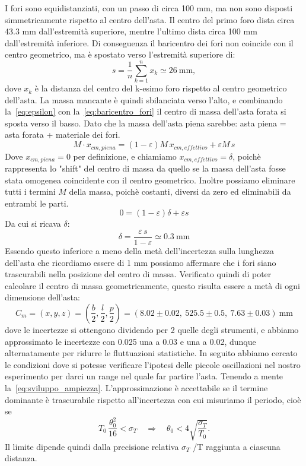 \documentclass[a4paper]{article}
\begin{document}
I fori sono equidistanziati, con un passo di circa 100 mm, ma non sono disposti simmetricamente rispetto al centro dell’asta. Il centro del primo foro dista circa 43.3 mm dall’estremità superiore, mentre l’ultimo dista circa 100 mm dall’estremità inferiore. Di conseguenza il baricentro dei fori non coincide con il centro geometrico, ma è spostato verso l’estremità superiore di:
\begin{equation}
    s = \frac{1}{n}\sum_{k=1}^{n} x_k \simeq 26\ \text{mm},
    \label{eq:baricentro_fori}
\end{equation}
dove $x_k$ è la distanza del centro del k-esimo foro rispetto al centro geometrico dell’asta. La massa mancante è quindi sbilanciata verso l’alto, e combinando la~\eqref{eq:epsilon} con la~\eqref{eq:baricentro_fori} il centro di massa dell’asta forata si sposta verso il basso. 
\newline
Dato che la massa dell'asta piena sarebbe: asta piena = asta forata + materiale dei fori.
$$M \cdot x_{cm, piena} = (1-\varepsilon)M\, x_{cm, effettivo} + \varepsilon M\, s$$
Dove $x_{cm,piena}=0$ per definizione, e chiamiamo $x_{cm,effettivo}=\delta$, poichè rappresenta lo "shift" del centro di massa da quello se la massa dell'asta fosse stata omogenea coincidente con il centro geometrico. Inoltre possiamo eliminare tutti i termini $M$ della massa, poichè costanti, diversi da zero ed eliminabili da entrambi le parti.
$$0 = (1-\varepsilon)\delta + \varepsilon s$$
Da cui si ricava $\delta$:
\begin{equation}
    \delta = \frac{\varepsilon\, s}{1-\varepsilon} \simeq 0.3\ \text{mm}
    \label{eq:spostamento_cm}
\end{equation}
 Essendo questo inferiore a meno della metà dell'incertezza sulla lunghezza dell'asta che ricordiamo essere di 1 mm possiamo affermare che i fori siano trascurabili nella posizione del centro di massa.
Verificato quindi di poter calcolare il centro di massa geometricamente, questo risulta essere a metà di ogni dimensione dell'asta:
\begin{equation}
    C_m = (x, y, z) = \left(\frac{b}{2}, \frac{l}{2}, \frac{p}{2}\right) = (8.02 \pm 0.02,\ 525.5 \pm 0.5,\ 7.63 \pm 0.03)\ \text{mm}
    \label{eq:centro_massa}
\end{equation}
dove le incertezze si ottengono dividendo per 2 quelle degli strumenti, e abbiamo approssimato le incertezze con 0.025 una a 0.03 e una a 0.02, dunque alternatamente per ridurre le fluttuazioni statistiche.
In seguito abbiamo cercato le condizioni dove si potesse verificare l'ipotesi delle piccole oscillazioni nel nostro esperimento per darci un range nel quale far partire l'asta.
Tenendo a mente la~\eqref{eq:sviluppo_ampiezza}.
L’approssimazione è accettabile se il termine dominante è trascurabile rispetto all’incertezza con cui misuriamo il periodo, cioè se
\begin{equation}
    T_0\,\frac{\theta_0^2}{16} < \sigma_T \quad\Longrightarrow\quad \theta_0 < 4\sqrt{\frac{\sigma_T}{T_0}} .
    \label{eq:limite_ampiezza}
\end{equation}
Il limite dipende quindi dalla precisione relativa $\sigma_T$ /T raggiunta a ciascuna distanza.
\end{document}
